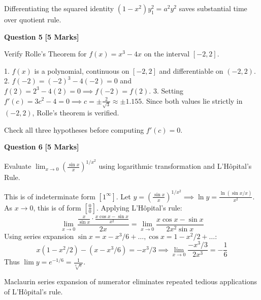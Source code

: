 \begin{examinertip}
Differentiating the squared identity $(1-x^2)y_1^2 = a^2 y^2$ saves substantial time over quotient rule.
\end{examinertip}

\vspace{4mm}

\noindent\textbf{Question 5} \hfill \textbf{[5 Marks]}

Verify Rolle's Theorem for $f(x) = x^3 - 4x$ on the interval $[-2, 2]$.

\begin{solbox}
1. $f(x)$ is a polynomial, continuous on $[-2, 2]$ and differentiable on $(-2, 2)$.
2. $f(-2) = (-2)^3 - 4(-2) = 0$ and $f(2) = 2^3 - 4(2) = 0 \implies f(-2) = f(2)$.
3. Setting $f'(c) = 3c^2 - 4 = 0 \implies c = \pm \frac{2}{\sqrt{3}} \approx \pm 1.155$.
Since both values lie strictly in $(-2, 2)$, Rolle's theorem is verified.
\end{solbox}

\begin{examinertip}
Check all three hypotheses before computing $f'(c) = 0$.
\end{examinertip}

\vspace{4mm}

\noindent\textbf{Question 6} \hfill \textbf{[5 Marks]}

Evaluate $\lim_{x\to 0} \left(\frac{\sin x}{x}\right)^{1/x^2}$ using logarithmic transformation and L'H\^opital's Rule.

\begin{solbox}
This is of indeterminate form $[1^\infty]$.
Let $y = \left(\frac{\sin x}{x}\right)^{1/x^2} \implies \ln y = \frac{\ln(\sin x / x)}{x^2}$.
As $x \to 0$, this is of form $\left[\frac{0}{0}\right]$.
Applying L'H\^opital's rule:
\begin{equation}
\lim_{x\to 0} \frac{\frac{x}{\sin x} \cdot \frac{x\cos x - \sin x}{x^2}}{2x} = \lim_{x\to 0} \frac{x\cos x - \sin x}{2x^2 \sin x}
\end{equation}
Using series expansion $\sin x = x - x^3/6 + \dots, \cos x = 1 - x^2/2 + \dots$:
\begin{equation}
x(1 - x^2/2) - (x - x^3/6) = -x^3/3 \implies \lim_{x\to 0} \frac{-x^3/3}{2x^3} = -\frac{1}{6}
\end{equation}
Thus $\lim y = e^{-1/6} = \frac{1}{\sqrt[6]{e}}$.
\end{solbox}

\begin{examinertip}
Maclaurin series expansion of numerator eliminates repeated tedious applications of L'H\^opital's rule.
\end{examinertip}

\vspace{4mm}

